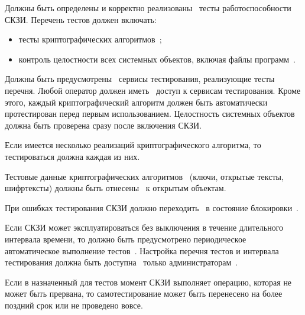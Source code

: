 \label{R.ST.Tests} %
Должны быть определены и корректно 
реализованы~
тесты работоспособности СКЗИ.
Перечень тестов должен включать:
\begin{itemize}
\item
тесты криптографических алгоритмов~;
\item
контроль целостности всех системных объектов, включая файлы 
программ~.
\end{itemize}
Должны быть предусмотрены~ сервисы тестирования, реализующие 
тесты перечня. Любой оператор должен иметь~ доступ к 
сервисам тестирования.
%
Кроме этого, каждый криптографический алгоритм должен быть автоматически 
протестирован перед первым использованием.
%
Целостность системных объектов должна быть проверена сразу после включения 
СКЗИ.

\begin{note}
Если имеется несколько реализаций криптографического алгоритма, 
то тестироваться должна каждая из них.
\end{note}

\label{R.ST.TestData} %
Тестовые данные криптографических алгоритмов~ 
(ключи, открытые тексты, шифртексты) 
должны быть отнесены~ к открытым объектам.

\label{R.ST.TestLock} %
При ошибках тестирования СКЗИ должно переходить~ 
в состояние блокировки~.


\label{R.ST.Periodic} %
Если СКЗИ может эксплуатироваться без выключения в течение длительного интервала
времени, то должно быть предусмотрено периодическое автоматическое выполнение 
тестов~. Настройка перечня тестов и интервала тестирования
должна быть доступна~ только 
администраторам~.

\begin{note}
Если в назначенный для тестов момент СКЗИ выполняет операцию, которая не может 
быть прервана, то самотестирование может быть перенесено на более поздний срок
или не проведено вовсе.
%
\end{note} 
